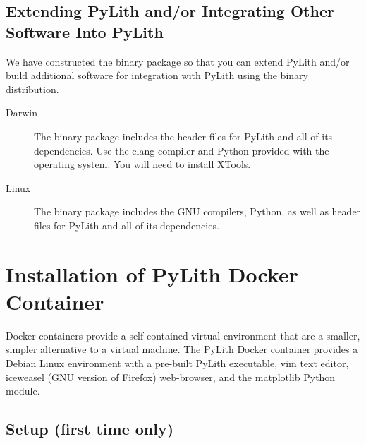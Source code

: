\subsection{Extending PyLith and/or Integrating Other Software Into PyLith}

We have constructed the binary package so that you can extend PyLith
and/or build additional software for integration with PyLith using the
binary distribution.

\begin{description}
\item[Darwin] The binary package includes the header files for PyLith
  and all of its dependencies. Use the clang compiler and Python
  provided with the operating system. You will need to install XTools.
\item[Linux] The binary package includes the GNU compilers, Python, as
  well as header files for PyLith and all of its dependencies.
\end{description}


\section{Installation of PyLith Docker Container}

Docker containers provide a self-contained virtual environment that
are a smaller, simpler alternative to a virtual machine. The PyLith
Docker container provides a Debian Linux environment with a pre-built
PyLith executable, vim text editor, iceweasel (GNU version of Firefox)
web-browser, and the matplotlib Python module.

\subsection{Setup (first time only)}

